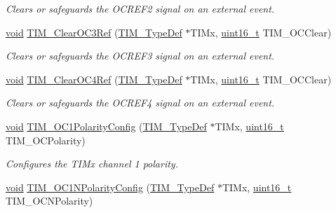 \begin{DoxyCompactItemize}
\begin{DoxyCompactList}\small\item\em Clears or safeguards the O\+C\+R\+E\+F2 signal on an external event. \end{DoxyCompactList}\item 
\hyperlink{usb__devapi_8h_afabf60e7f57651d6d595a02c75f07cd0}{void} \hyperlink{group___t_i_m___private___functions_ga0bd9476a14bd346c319945ec4fa2bc67}{T\+I\+M\+\_\+\+Clear\+O\+C3\+Ref} (\hyperlink{struct_t_i_m___type_def}{T\+I\+M\+\_\+\+Type\+Def} $\ast$T\+I\+Mx, \hyperlink{_p_e___types_8h_a1f1825b69244eb3ad2c7165ddc99c956}{uint16\+\_\+t} T\+I\+M\+\_\+\+O\+C\+Clear)
\begin{DoxyCompactList}\small\item\em Clears or safeguards the O\+C\+R\+E\+F3 signal on an external event. \end{DoxyCompactList}\item 
\hyperlink{usb__devapi_8h_afabf60e7f57651d6d595a02c75f07cd0}{void} \hyperlink{group___t_i_m___private___functions_gaeee5fa66b26e7c6f71850272dc3028f3}{T\+I\+M\+\_\+\+Clear\+O\+C4\+Ref} (\hyperlink{struct_t_i_m___type_def}{T\+I\+M\+\_\+\+Type\+Def} $\ast$T\+I\+Mx, \hyperlink{_p_e___types_8h_a1f1825b69244eb3ad2c7165ddc99c956}{uint16\+\_\+t} T\+I\+M\+\_\+\+O\+C\+Clear)
\begin{DoxyCompactList}\small\item\em Clears or safeguards the O\+C\+R\+E\+F4 signal on an external event. \end{DoxyCompactList}\item 
\hyperlink{usb__devapi_8h_afabf60e7f57651d6d595a02c75f07cd0}{void} \hyperlink{group___t_i_m___private___functions_ga03878f78163485c8a3508cff2111c297}{T\+I\+M\+\_\+\+O\+C1\+Polarity\+Config} (\hyperlink{struct_t_i_m___type_def}{T\+I\+M\+\_\+\+Type\+Def} $\ast$T\+I\+Mx, \hyperlink{_p_e___types_8h_a1f1825b69244eb3ad2c7165ddc99c956}{uint16\+\_\+t} T\+I\+M\+\_\+\+O\+C\+Polarity)
\begin{DoxyCompactList}\small\item\em Configures the T\+I\+Mx channel 1 polarity. \end{DoxyCompactList}\item 
\hyperlink{usb__devapi_8h_afabf60e7f57651d6d595a02c75f07cd0}{void} \hyperlink{group___t_i_m___private___functions_ga3cb91578e7dd34ea7d09862482960445}{T\+I\+M\+\_\+\+O\+C1\+N\+Polarity\+Config} (\hyperlink{struct_t_i_m___type_def}{T\+I\+M\+\_\+\+Type\+Def} $\ast$T\+I\+Mx, \hyperlink{_p_e___types_8h_a1f1825b69244eb3ad2c7165ddc99c956}{uint16\+\_\+t} T\+I\+M\+\_\+\+O\+C\+N\+Polarity)

\end{DoxyCompactItemize}
